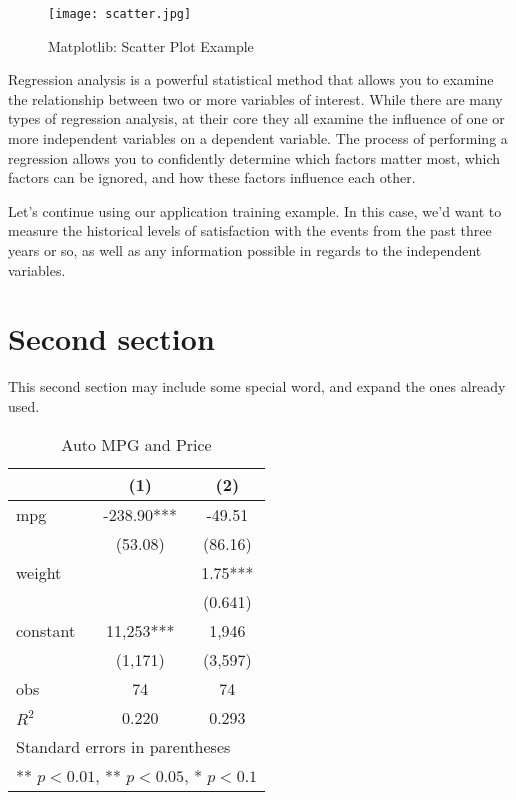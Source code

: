 \documentclass[11pt]{elegantbook}
\begin{document}
\begin{figure}[htbp]
  \centering
  \texttt{[image: scatter.jpg]}
  \caption{Matplotlib: Scatter Plot Example\label{fig:scatter}}
\end{figure}

Regression analysis is a powerful statistical method that allows you to examine the relationship between two or more variables of interest. While there are many types of regression analysis, at their core they all examine the influence of one or more independent variables on a dependent variable. The process of performing a regression allows you to confidently determine which factors matter most, which factors can be ignored, and how these factors influence each other.

Let's continue using our application training example. In this case, we'd want to measure the historical levels of satisfaction with the events from the past three years or so, as well as any information possible in regards to the independent variables. 

\section{Second section}
This second section may include some special word, 
and expand the ones already used.


\begin{table}[htbp]
  \small
  \centering
  \caption{Auto MPG and Price \label{tab:reg}}
    \begin{tabular}{lcc}
    \toprule
                    &       (1)         &        (2)      \\
    \midrule
    mpg             &    -238.90***     &      -49.51     \\
                    &     (53.08)       &      (86.16)    \\
    weight          &                   &      1.75***    \\
                    &                   &      (0.641)    \\
    constant        &     11,253***     &       1,946     \\
                    &     (1,171)       &      (3,597)   \\
    obs             &        74         &         74     \\
    $R^2$           &      0.220        &       0.293    \\
    \bottomrule
    \multicolumn{3}{l}{\scriptsize Standard errors in parentheses} \\
    \multicolumn{3}{l}{\scriptsize *** $p < 0.01$, ** $p<0.05$, * $p<0.1$} \\
    \end{tabular}%
\end{table}%
\end{document}
